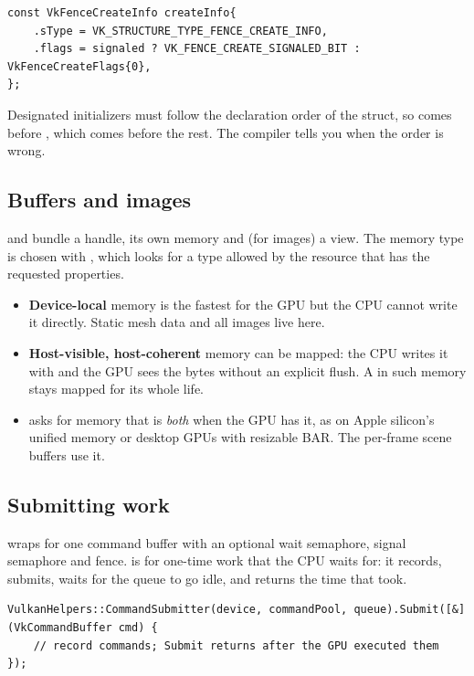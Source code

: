 \documentclass[11pt,a4paper]{article}
\begin{document}
\begin{lstlisting}
const VkFenceCreateInfo createInfo{
    .sType = VK_STRUCTURE_TYPE_FENCE_CREATE_INFO,
    .flags = signaled ? VK_FENCE_CREATE_SIGNALED_BIT : VkFenceCreateFlags{0},
};
\end{lstlisting}

\begin{pitfall}
Designated initializers must follow the declaration order of the struct, so  comes before , which comes before the rest. The compiler tells you when the order is wrong.
\end{pitfall}

\subsection{Buffers and images}

 and  bundle a handle, its own memory and (for images) a view. The memory type is chosen with , which looks for a type allowed by the resource that has the requested properties.

\begin{itemize}
  \item \textbf{Device-local} memory is the fastest for the GPU but the CPU cannot write it directly. Static mesh data and all images live here.
  \item \textbf{Host-visible, host-coherent} memory can be mapped: the CPU writes it with  and the GPU sees the bytes without an explicit flush. A  in such memory stays mapped for its whole life.
  \item {} asks for memory that is \emph{both} when the GPU has it, as on Apple silicon's unified memory or desktop GPUs with resizable BAR. The per-frame scene buffers use it.
\end{itemize}

\subsection{Submitting work}

 wraps  for one command buffer with an optional wait semaphore, signal semaphore and fence.  is for one-time work that the CPU waits for: it records, submits, waits for the queue to go idle, and returns the time that took.

\begin{lstlisting}
VulkanHelpers::CommandSubmitter(device, commandPool, queue).Submit([&](VkCommandBuffer cmd) {
    // record commands; Submit returns after the GPU executed them
});
\end{lstlisting}
\end{document}
